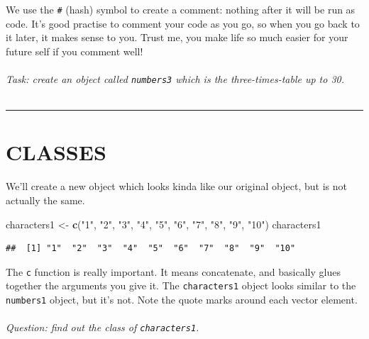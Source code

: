 \documentclass[
]{book}
\newenvironment{Shaded}{\begin{snugshade}}{\end{snugshade}}
\newcommand{\KeywordTok}[1]{\textcolor[rgb]{0.13,0.29,0.53}{\textbf{#1}}}
\newcommand{\NormalTok}[1]{#1}
\newcommand{\StringTok}[1]{\textcolor[rgb]{0.31,0.60,0.02}{#1}}
\begin{document}
We use the \texttt{\#} (hash) symbol to create a comment: nothing after it will be run
as code. It's good practise to comment your code as you go, so when you
go back to it later, it makes sense to you. Trust me, you make life so much
easier for your future self if you comment well!\\
~\\

\emph{Task: create an object called \texttt{numbers3} which is the three-times-table up to
30.}\\
~\\

\begin{center}\rule{0.5\linewidth}{\linethickness}\end{center}

\hypertarget{classes}{%
\section{CLASSES}\label{classes}}

We'll create a new object which looks kinda like our original object, but is
not actually the same.

\begin{Shaded}
\begin{Highlighting}[]
\NormalTok{characters1 <-}\StringTok{ }\KeywordTok{c}\NormalTok{(}\StringTok{"1"}\NormalTok{, }\StringTok{"2"}\NormalTok{, }\StringTok{"3"}\NormalTok{, }\StringTok{"4"}\NormalTok{, }\StringTok{"5"}\NormalTok{, }\StringTok{"6"}\NormalTok{, }\StringTok{"7"}\NormalTok{, }\StringTok{"8"}\NormalTok{, }\StringTok{"9"}\NormalTok{, }\StringTok{"10"}\NormalTok{)}
\NormalTok{characters1}
\end{Highlighting}
\end{Shaded}

\begin{verbatim}
##  [1] "1"  "2"  "3"  "4"  "5"  "6"  "7"  "8"  "9"  "10"
\end{verbatim}

The \texttt{c} function is really important. It means concatenate, and basically
glues together the arguments you give it. The \texttt{characters1} object
looks similar to the \texttt{numbers1} object, but it's not. Note the quote marks
around each vector element.\\
~\\

\emph{Question: find out the class of \texttt{characters1}.}\\
~\\
\end{document}
